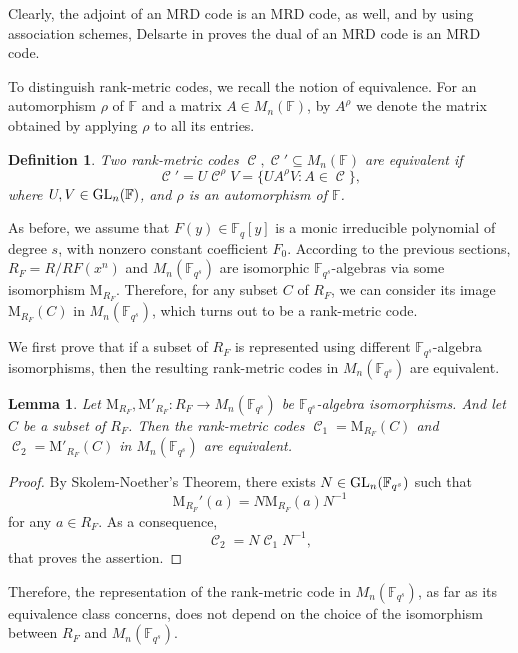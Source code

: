 \documentclass[a4paper, 11pt]{article}
\DeclareMathOperator{\C}{\mathcal{C}}
\newtheorem{lemma}[theorem]{Lemma}
\newtheorem{definition}[theorem]{Definition}
\newcommand{\F}{{\mathbb F}}
\newcommand{\GL}{\hbox{{\rm GL}}}
\newcommand{\M}{\mathrm{M}}
\begin{document}
Clearly, the adjoint of an MRD code is an MRD code, as well, and by using association schemes, Delsarte in \cite{delsarte1978bilinear} proves the dual of an MRD code is an MRD code. 

To distinguish rank-metric codes, we recall the notion of equivalence. For an automorphism $\rho$ of $\F$ and a matrix $A \in M_n(\F)$, by $A^{\rho}$ we denote the matrix obtained by applying $\rho$ to all its entries.

\begin{definition}
Two rank-metric codes $\C,\C' \subseteq M_n(\F)$ are equivalent if
\begin{equation} \label{eq:equivalencecode}
\C'=U \C^{\rho} V=\{UA^{\rho}V \colon A \in \C\},
\end{equation}
where $U,V \in \GL_n(\F)$, and $\rho$ is an automorphism of $\F$.
\end{definition}



As before, we assume that $F(y) \in \F_q[y]$ is a monic irreducible polynomial of degree $s$, with nonzero constant coefficient $F_0$.  According to the previous sections,  $R_F = R / RF(x^n)$ and $M_n(\F_{q^s})$ are isomorphic  $\F_{q^s}$-algebras via some isomorphism $\M_{R_F}$. Therefore, for any subset $C$ of $R_F$, we can consider its image $\M_{R_F}(C)$ in $M_n(\F_{q^s})$, which turns out to be a rank-metric code. 

We first prove that if a subset of \(R_F\) is represented using different $\F_{q^s}$-algebra isomorphisms, then the resulting rank-metric codes in $M_n(\F_{q^s})$ are equivalent.

\begin{lemma} \label{lm:indipendencerepresentation}
    Let $\M_{R_F},\M'_{R_F}:R_F \rightarrow M_n(\F_{q^s})$ be $\F_{q^s}$-algebra isomorphisms. And let $C$ be a subset of $R_F$. Then the rank-metric codes $\C_1=\M_{R_F}(C)$ and $\C_2=\M'_{R_F}(C)$ in $M_n(\F_{q^s})$ are equivalent. 
\end{lemma}

\begin{proof}
By Skolem-Noether's Theorem, there exists $N \in \GL_n(\F_{q^s})$ such that
\[
\M_{R_F}'(a)=N\M_{R_F}(a) N^{-1}
\]
for any $a \in R_F$. As a consequence,
\[
\C_2=N \C_1 N^{-1},
\]
that proves the assertion. 
\end{proof}

Therefore, the representation of the rank-metric code in $M_n(\F_{q^s})$, as far as its equivalence class concerns, does not depend on the choice of the isomorphism between $R_F$ and $M_n(\F_{q^s})$.
\end{document}
